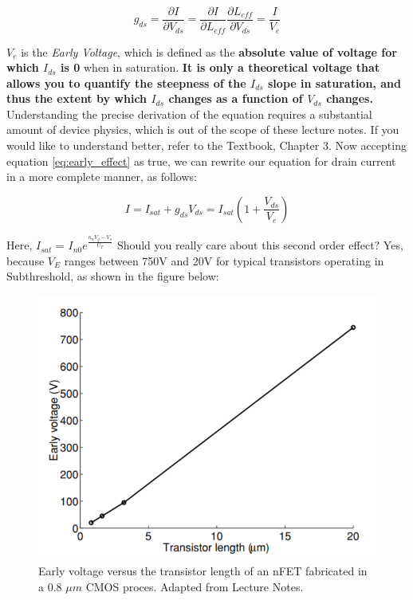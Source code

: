 \begin{equation}
g_{ds} = \frac{\partial I}{\partial V_{ds}} = \frac{\partial I}{\partial L_{eff}}\frac{\partial L_{eff}}{\partial V_{ds}} = \frac{I}{V_e} \label{eq:early_effect}
\end{equation}

$V_{e}$ is the \emph{Early Voltage}, which is defined as the \textbf{absolute value of voltage for which $I_{ds}$ is 0} when in saturation. \textbf{It is only a theoretical voltage that allows you to quantify the steepness of the $I_{ds}$ slope in saturation, and thus the extent by which $I_{ds}$ changes as a function of $V_{ds}$ changes.}
Understanding the precise derivation of the equation requires a substantial amount of device physics, which is out of the scope of these lecture notes. If you would like to understand better, refer to the Textbook, Chapter 3. Now accepting equation \ref{eq:early_effect} as true, we can rewrite our equation for drain current in a more complete manner, as follows:

\begin{equation}
    I = I_{sat} + g_{ds}V_{ds} = I_{sat}(1 + \frac{V_{ds}}{V_e})
\end{equation}

Here, $I_{sat}$ =  $I_{n0} e^{\frac{\kappa_{n}V_g - V_s}{U_T}}$
Should you really care about this second order effect? Yes, because $V_E$ ranges between 750V and 20V for typical transistors operating in Subthreshold, as shown in the figure below: 

\begin{figure}[H]
    \centering
    \includegraphics[width=0.65\linewidth]{../../Figures/Early_Voltage_Vs_MOSFET_Length.PNG}
    \caption{Early voltage versus the transistor length of an nFET fabricated in a 0.8 $\mu m$ CMOS proces. Adapted from Lecture Notes.}
    \label{fig:basalandcerebellum}
\end{figure}

